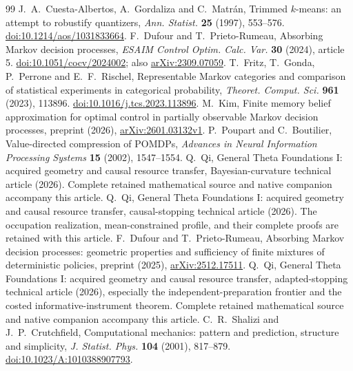 \begin{thebibliography}{99}
 J.~A.~Cuesta-Albertos, A.~Gordaliza and C.~Matr\'an, Trimmed $k$-means: an attempt to robustify quantizers, \emph{Ann. Statist.} \textbf{25} (1997), 553--576. \href{https://doi.org/10.1214/aos/1031833664}{doi:10.1214/aos/1031833664}.
 F.~Dufour and T.~Prieto-Rumeau, Absorbing Markov decision processes, \emph{ESAIM Control Optim. Calc. Var.} \textbf{30} (2024), article 5. \href{https://doi.org/10.1051/cocv/2024002}{doi:10.1051/cocv/2024002}; also \href{https://arxiv.org/abs/2309.07059}{arXiv:2309.07059}.
 T.~Fritz, T.~Gonda, P.~Perrone and E.~F.~Rischel, Representable Markov categories and comparison of statistical experiments in categorical probability, \emph{Theoret. Comput. Sci.} \textbf{961} (2023), 113896. \href{https://doi.org/10.1016/j.tcs.2023.113896}{doi:10.1016/j.tcs.2023.113896}.
 M.~Kim, Finite memory belief approximation for optimal control in partially observable Markov decision processes, preprint (2026), \href{https://arxiv.org/abs/2601.03132v1}{arXiv:2601.03132v1}.
 P.~Poupart and C.~Boutilier, Value-directed compression of POMDPs, \emph{Advances in Neural Information Processing Systems} \textbf{15} (2002), 1547--1554.
 Q.~Qi, General Theta Foundations I: acquired geometry and causal resource transfer, Bayesian-curvature technical article (2026). Complete retained mathematical source and native companion accompany this article.
 Q.~Qi, General Theta Foundations I: acquired geometry and causal resource transfer, causal-stopping technical article (2026). The occupation realization, mean-constrained profile, and their complete proofs are retained with this article.
 F.~Dufour and T.~Prieto-Rumeau, Absorbing Markov decision processes: geometric properties and sufficiency of finite mixtures of deterministic policies, preprint (2025), \href{https://arxiv.org/abs/2512.17511}{arXiv:2512.17511}.
 Q.~Qi, General Theta Foundations I: acquired geometry and causal resource transfer, adapted-stopping technical article (2026), especially the independent-preparation frontier and the costed informative-instrument theorem. Complete retained mathematical source and native companion accompany this article.
 C.~R.~Shalizi and J.~P.~Crutchfield, Computational mechanics: pattern and prediction, structure and simplicity, \emph{J. Statist. Phys.} \textbf{104} (2001), 817--879. \href{https://doi.org/10.1023/A:1010388907793}{doi:10.1023/A:1010388907793}.

\end{thebibliography}
